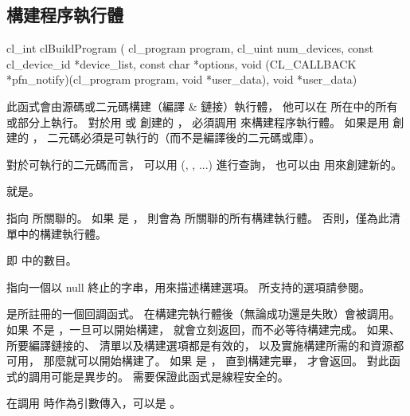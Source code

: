 \subsection{構建程序執行體}


\startCLFUNC
cl_int clBuildProgram (
		cl_program program,
		cl_uint num_devices,
		const cl_device_id *device_list,
		const char *options,
		void (CL_CALLBACK *pfn_notify)(cl_program program,
					void *user_data),
		void *user_data)
\stopCLFUNC

此函式會由源碼或二元碼構建（編譯 & 鏈接）執行體，
他可以在  所在中的所有或部分上執行。
對於用  或 
創建的 ，
必須調用  來構建程序執行體。
如果是用  創建的 ，
二元碼必須是可執行的（而不是編譯後的二元碼或庫）。

對於可執行的二元碼而言，
可以用 (, , ...) 進行查詢，
也可以由  用來創建新的。

 就是。

 指向  所關聯的。
如果  是 ，
則會為  所關聯的所有構建執行體。
否則，僅為此清單中的構建執行體。

 即  中的數目。

 指向一個以 null 終止的字串，用來描述構建選項。
所支持的選項請參閱。

 是所註冊的一個回調函式。
在構建完執行體後（無論成功還是失敗）會被調用。
如果  不是 ，一旦可以開始構建，
 就會立刻返回，而不必等待構建完成。
如果、所要編譯鏈接的、
清單以及構建選項都是有效的，
以及實施構建所需的和資源都可用，
那麼就可以開始構建了。
如果  是 ，
直到構建完畢，  才會返回。
對此函式的調用可能是異步的。
需要保證此函式是線程安全的。

 在調用  時作為引數傳入，可以是 。

